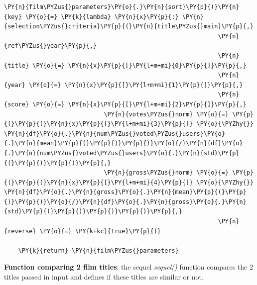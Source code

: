\begin{tcolorbox}[breakable, size=fbox, boxrule=1pt, pad at break*=1mm,colback=cellbackground, colframe=cellborder]
\begin{Verbatim}[commandchars=\\\{\}]
    \PY{n}{film\PYZus{}parameters}\PY{o}{.}\PY{n}{sort}\PY{p}{(}\PY{n}{key} \PY{o}{=} \PY{k}{lambda} \PY{n}{x}\PY{p}{:} \PY{n}{selection\PYZus{}criteria}\PY{p}{(}\PY{n}{title\PYZus{}main}\PY{p}{,}
                                                            \PY{n}{ref\PYZus{}year}\PY{p}{,} 
                                                            \PY{n}{title} \PY{o}{=} \PY{n}{x}\PY{p}{[}\PY{l+m+mi}{0}\PY{p}{]}\PY{p}{,} 
                                                            \PY{n}{year} \PY{o}{=} \PY{n}{x}\PY{p}{[}\PY{l+m+mi}{1}\PY{p}{]}\PY{p}{,}
                                                            \PY{n}{score} \PY{o}{=} \PY{n}{x}\PY{p}{[}\PY{l+m+mi}{2}\PY{p}{]}\PY{p}{,}
                            \PY{n}{votes\PYZus{}norm} \PY{o}{=} \PY{p}{(}\PY{p}{(}\PY{n}{x}\PY{p}{[}\PY{l+m+mi}{3}\PY{p}{]} \PY{o}{\PYZhy{}} \PY{n}{df}\PY{o}{.}\PY{n}{num\PYZus{}voted\PYZus{}users}\PY{o}{.}\PY{n}{mean}\PY{p}{(}\PY{p}{)}\PY{p}{)}\PY{o}{/}\PY{n}{df}\PY{o}{.}\PY{n}{num\PYZus{}voted\PYZus{}users}\PY{o}{.}\PY{n}{std}\PY{p}{(}\PY{p}{)}\PY{p}{)}\PY{p}{,}
                            \PY{n}{gross\PYZus{}norm} \PY{o}{=} \PY{p}{(}\PY{p}{(}\PY{n}{x}\PY{p}{[}\PY{l+m+mi}{4}\PY{p}{]} \PY{o}{\PYZhy{}} \PY{n}{df}\PY{o}{.}\PY{n}{gross}\PY{o}{.}\PY{n}{mean}\PY{p}{(}\PY{p}{)}\PY{p}{)}\PY{o}{/}\PY{n}{df}\PY{o}{.}\PY{n}{gross}\PY{o}{.}\PY{n}{std}\PY{p}{(}\PY{p}{)}\PY{p}{)}\PY{p}{)}\PY{p}{,}
                                                            \PY{n}{reverse} \PY{o}{=} \PY{k+kc}{True}\PY{p}{)}

    \PY{k}{return} \PY{n}{film\PYZus{}parameters}
\end{Verbatim}
\end{tcolorbox}

    \textbf{Function comparing 2 film titles}: the sequel \emph{sequel()}
function compares the 2 titles passed in input and defines if these
titles are similar or not.

